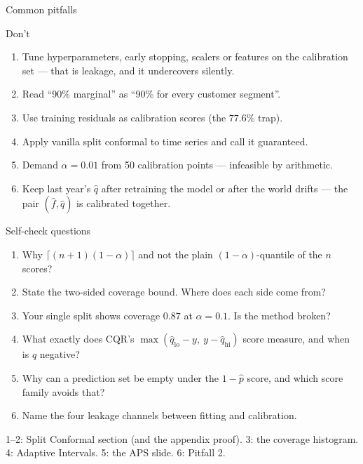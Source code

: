 \documentclass[aspectratio=169,11pt]{beamer}
\begin{document}
\begin{frame}{Common pitfalls}
  \begin{alertblock}{Don't}
    \begin{enumerate}
      \item Tune hyperparameters, early stopping, scalers or features on the
            calibration set --- that is leakage, and it undercovers silently.
      \item Read ``90\% marginal'' as ``90\% for every customer segment''.
      \item Use training residuals as calibration scores (the $77.6\%$ trap).
      \item Apply vanilla split conformal to time series and call it guaranteed.
      \item Demand $\alpha = 0.01$ from 50 calibration points --- infeasible by
            arithmetic.
      \item Keep last year's $\hat q$ after retraining the model or after the world
            drifts --- the pair $(\hat f, \hat q)$ is calibrated together.
    \end{enumerate}
  \end{alertblock}
\end{frame}

\begin{frame}{Self-check questions}
  \begin{readme}
    \begin{enumerate}
      \item Why $\lceil (n+1)(1-\alpha) \rceil$ and not the plain
            $(1-\alpha)$-quantile of the $n$ scores?
      \item State the two-sided coverage bound. Where does each side come from?
      \item Your single split shows coverage $0.87$ at $\alpha = 0.1$. Is the method
            broken?
      \item What exactly does CQR's $\max(\hat q_{\text{lo}} - y,\
            y - \hat q_{\text{hi}})$ score measure, and when is $\hat q$ negative?
      \item Why can a prediction set be empty under the $1 - \hat p$ score, and
            which score family avoids that?
      \item Name the four leakage channels between fitting and calibration.
    \end{enumerate}
  \end{readme}
  \begin{takeaway}
    1--2: Split Conformal section (and the appendix proof). 3: the coverage
    histogram. 4: Adaptive Intervals. 5: the APS slide. 6: Pitfall 2.
  \end{takeaway}
\end{frame}
\end{document}
